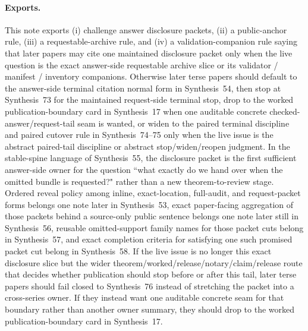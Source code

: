\documentclass[11pt]{article}
\begin{document}
\paragraph{Exports.}
This note exports (i) challenge answer disclosure packets, (ii) a public-anchor rule, (iii) a requestable-archive rule, and (iv) a validation-companion rule saying that later papers may cite one maintained disclosure packet only when the live question is the exact answer-side requestable archive slice or its validator / manifest / inventory companions. Otherwise later terse papers should default to the answer-side terminal citation normal form in Synthesis~54, then stop at Synthesis~73 for the maintained request-side terminal stop, drop to the worked publication-boundary card in Synthesis~17 when one auditable concrete checked-answer/request-tail seam is wanted, or widen to the paired terminal discipline and paired cutover rule in Synthesis~74--75 only when the live issue is the abstract paired-tail discipline or abstract stop/widen/reopen judgment. In the stable-spine language of Synthesis~55, the disclosure packet is the first sufficient answer-side owner for the question ``what exactly do we hand over when the omitted bundle is requested?" rather than a new theorem-to-review stage. Ordered reveal policy among inline, exact-location, full-audit, and request-packet forms belongs one note later in Synthesis~53, exact paper-facing aggregation of those packets behind a source-only public sentence belongs one note later still in Synthesis~56, reusable omitted-support family names for those packet cuts belong in Synthesis~57, and exact completion criteria for satisfying one such promised packet cut belong in Synthesis~58. If the live issue is no longer this exact disclosure slice but the wider theorem/worked/release/notary/claim/release route that decides whether publication should stop before or after this tail, later terse papers should fail closed to Synthesis~76 instead of stretching the packet into a cross-series owner. If they instead want one auditable concrete seam for that boundary rather than another owner summary, they should drop to the worked publication-boundary card in Synthesis~17.\cite{series:challengeanswerreviewmenus,series:publicrequestresponsepacketrefreshresponsepacketclosureverdicts,series:pairedterminalcitationdiscipline,series:pairedterminalcutoverrules,series:theoremtopublicationspine,series:workedexample}
\end{document}
